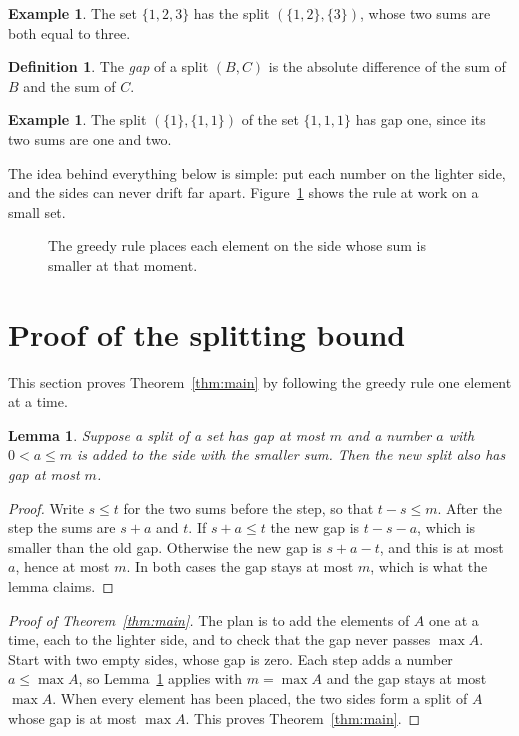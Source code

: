 \documentclass{amsart}
\newtheorem{lemma}[theorem]{Lemma}
\theoremstyle{definition}
\newtheorem{definition}[theorem]{Definition}
\newtheorem{example}[theorem]{Example}
\begin{document}
\begin{example}\label{ex:split}
The set $\{1,2,3\}$ has the split $(\{1,2\},\{3\})$, whose two sums are both equal to three.
\end{example}

\begin{definition}\label{def:gap}
The \emph{gap} of a split $(B,C)$ is the absolute difference of the sum of $B$ and the sum of $C$.
\end{definition}

\begin{example}\label{ex:gap}
The split $(\{1\},\{1,1\})$ of the set $\{1,1,1\}$ has gap one, since its two sums are one and two.
\end{example}

The idea behind everything below is simple: put each number on the lighter side, and the sides can never drift far apart.
Figure~\ref{fig:greedy} shows the rule at work on a small set.

\begin{figure}
\centering
{}
\caption{The greedy rule places each element on the side whose sum is smaller at that moment.}\label{fig:greedy}
\end{figure}

\section{Proof of the splitting bound}\label{sec:proof}

This section proves Theorem~\ref{thm:main} by following the greedy rule one element at a time.

\begin{lemma}\label{lem:step}
Suppose a split of a set has gap at most $m$ and a number $a$ with $0<a\le m$ is added to the side with the smaller sum.
Then the new split also has gap at most $m$.
\end{lemma}

\begin{proof}
Write $s\le t$ for the two sums before the step, so that $t-s\le m$. After the step the sums are $s+a$ and $t$. If $s+a\le t$
the new gap is $t-s-a$, which is smaller than the old gap. Otherwise the new gap is $s+a-t$, and this is at most $a$, hence at
most $m$. In both cases the gap stays at most $m$, which is what the lemma claims.
\end{proof}

\begin{proof}[Proof of Theorem~\ref{thm:main}]
The plan is to add the elements of $A$ one at a time, each to the lighter side, and to check that the gap never passes
$\max A$. Start with two empty sides, whose gap is zero. Each step adds a number $a\le \max A$, so Lemma~\ref{lem:step} applies
with $m=\max A$ and the gap stays at most $\max A$. When every element has been placed, the two sides form a split of $A$
whose gap is at most $\max A$. This proves Theorem~\ref{thm:main}.
\end{proof}
\end{document}
